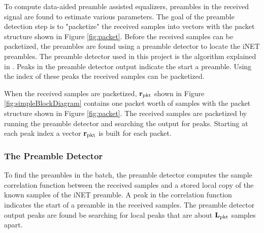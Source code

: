 To compute data-aided preamble assisted equalizers, preambles in the received signal are found to estimate various parameters.
The goal of the preamble detection step is to "packetize" the received samples into vectors with the packet structure shown in Figure \ref{fig:packet}.
Before the received samples can be packetized, the preambles are found using a preamble detector to locate the iNET preambles. 
The preamble detector used in this project is the algorithm explained in \cite{preamble_detector}.
Peaks in the preamble detector output indicate the start a preamble.
Using the index of these peaks the received samples can be packetized.

When the received samples are packetized, $\mathbf{r}_\text{pkt}$ shown in Figure \ref{fig:simpleBlockDiagram} contains one packet worth of samples with the packet structure shown in Figure \ref{fig:packet}.
The received samples are packetized by running the preamble detector and searching the output for peaks.
Starting at each peak index a vector $\mathbf{r}_\text{pkt}$ is built for each packet.

\subsubsection{The Preamble Detector}
To find the preambles in the batch, the preamble detector computes the sample correlation function between the received samples and a stored local copy of the known samples of the iNET preamble. 
A peak in the correlation function indicates the start of a preamble in the received samples. 
The preamble detector output peaks are found be searching for local peaks that are about $\mathbf{L}_\text{pkt}$ samples apart.

